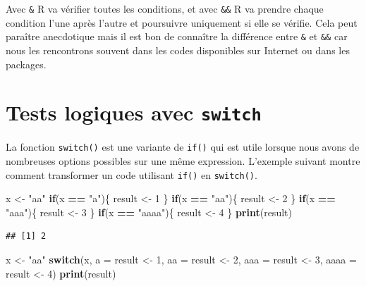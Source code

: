 \documentclass[]{book}
\newenvironment{Shaded}{\begin{snugshade}}{\end{snugshade}}
\newcommand{\ControlFlowTok}[1]{\textcolor[rgb]{0.13,0.29,0.53}{\textbf{#1}}}
\newcommand{\DataTypeTok}[1]{\textcolor[rgb]{0.13,0.29,0.53}{#1}}
\newcommand{\DecValTok}[1]{\textcolor[rgb]{0.00,0.00,0.81}{#1}}
\newcommand{\KeywordTok}[1]{\textcolor[rgb]{0.13,0.29,0.53}{\textbf{#1}}}
\newcommand{\NormalTok}[1]{#1}
\newcommand{\OperatorTok}[1]{\textcolor[rgb]{0.81,0.36,0.00}{\textbf{#1}}}
\newcommand{\StringTok}[1]{\textcolor[rgb]{0.31,0.60,0.02}{#1}}
\begin{document}
Avec \texttt{\&} R va vérifier toutes les conditions, et avec \texttt{\&\&} R va prendre chaque condition l'une après l'autre et poursuivre uniquement si elle se vérifie. Cela peut paraître anecdotique mais il est bon de connaître la différence entre \texttt{\&} et \texttt{\&\&} car nous les rencontrons souvent dans les codes disponibles sur Internet ou dans les packages.

\hypertarget{l17switch}{%
\section{\texorpdfstring{Tests logiques avec \texttt{switch}}{Tests logiques avec switch}}\label{l17switch}}

La fonction \texttt{switch()} est une variante de \texttt{if()} qui est utile lorsque nous avons de nombreuses options possibles sur une même expression. L'exemple suivant montre comment transformer un code utilisant \texttt{if()} en \texttt{switch()}.

\begin{Shaded}
\begin{Highlighting}[]
\NormalTok{x <-}\StringTok{ "aa"}
\ControlFlowTok{if}\NormalTok{(x }\OperatorTok{==}\StringTok{ "a"}\NormalTok{)\{}
\NormalTok{  result <-}\StringTok{ }\DecValTok{1}
\NormalTok{\}}
\ControlFlowTok{if}\NormalTok{(x }\OperatorTok{==}\StringTok{ "aa"}\NormalTok{)\{}
\NormalTok{  result <-}\StringTok{ }\DecValTok{2}
\NormalTok{\}}
\ControlFlowTok{if}\NormalTok{(x }\OperatorTok{==}\StringTok{ "aaa"}\NormalTok{)\{}
\NormalTok{  result <-}\StringTok{ }\DecValTok{3}
\NormalTok{\}}
\ControlFlowTok{if}\NormalTok{(x }\OperatorTok{==}\StringTok{ "aaaa"}\NormalTok{)\{}
\NormalTok{  result <-}\StringTok{ }\DecValTok{4}
\NormalTok{\}}
\KeywordTok{print}\NormalTok{(result)}
\end{Highlighting}
\end{Shaded}

\begin{verbatim}
## [1] 2
\end{verbatim}

\begin{Shaded}
\begin{Highlighting}[]
\NormalTok{x <-}\StringTok{ "aa"}
\ControlFlowTok{switch}\NormalTok{(x, }
  \DataTypeTok{a =}\NormalTok{ result <-}\StringTok{ }\DecValTok{1}\NormalTok{,}
  \DataTypeTok{aa =}\NormalTok{ result <-}\StringTok{ }\DecValTok{2}\NormalTok{,}
  \DataTypeTok{aaa =}\NormalTok{ result <-}\StringTok{ }\DecValTok{3}\NormalTok{,}
  \DataTypeTok{aaaa =}\NormalTok{ result <-}\StringTok{ }\DecValTok{4}\NormalTok{)}
\KeywordTok{print}\NormalTok{(result)}
\end{Highlighting}
\end{Shaded}
\end{document}
